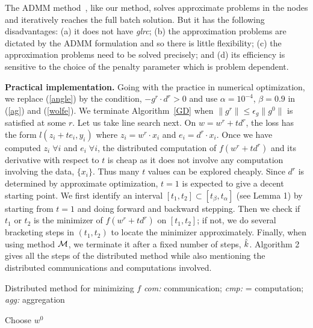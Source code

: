 The ADMM method~\cite{Boyd2011}, like our method, solves approximate problems in the nodes and iteratively reaches the full batch solution. But it has the following disadvantages: (a) it does not have {\it glrc}; (b) the approximation problems are dictated by the ADMM formulation and so there is little flexibility; (c) the approximation problems need to be solved precisely; and (d) its efficiency is sensitive to the choice of the penalty parameter which is problem dependent.

{\bf Practical implementation.} Going with the practice in numerical optimization, we replace (\ref{angle}) by the condition, $-g^r\cdot d^r > 0$ and use $\alpha=10^{-4}$, $\beta=0.9$ in (\ref{ag}) and (\ref{wolfe}). We terminate Algorithm~\ref{GD} when $\|g^r\|\le \epsilon_g\|g^0\|$ is satisfied at some $r$. Let us take line search next. On $w=w^r+t d^r$, the loss has the form $l(z_i+te_i,y_i)$ where $z_i=w^r\cdot x_i$ and $e_i=d^r\cdot x_i$. Once we have computed $z_i\;\forall i$ and $e_i\;\forall i$, the distributed computation of $f(w^r+t d^r)$ and its derivative with respect to $t$ is cheap as it does not involve any computation involving the data, $\{x_i\}$. Thus many $t$ values can be explored cheaply. Since $d^r$ is determined by approximate optimization, $t=1$ is expected to give a decent starting point. We first identify an interval $[t_1,t_2]\subset [t_\beta,t_\alpha]$ (see Lemma 1) by starting from $t=1$ and doing forward and backward stepping. Then we check if $t_1$ or $t_2$ is the minimizer of $f(w^r+t d^r)$ on $[t_1,t_2]$; if not, we do several bracketing steps in $(t_1,t_2)$ to locate the minimizer approximately. Finally, when using method ${\cal M}$, we terminate it after a fixed number of steps, $\hat{k}$. Algorithm 2 gives all the steps of the distributed method while also mentioning the distributed communications and computations involved.

\begin{algorithm2e}
\caption{Distributed method for minimizing $f$
{\it com:} communication; {\it cmp:} = computation; {\it agg:} aggregation}
Choose $w^0$\;
\end{algorithm2e}

